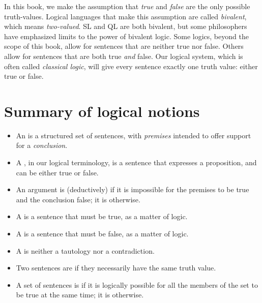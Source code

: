 In this book, we make the assumption that \emph{true} and \emph{false} are the only possible truth-values. Logical languages that make this assumption are called \emph{bivalent}, which means \emph{two-valued}. SL and QL are both bivalent, but some philosophers have emphasized limits to the power of bivalent logic. Some logics, beyond the scope of this book, allow for sentences that are neither true nor false. Others allow for sentences that are both true \emph{and} false. Our logical system, which is often called \emph{classical logic}, will give every sentence exactly one truth value: either true or false.


\section*{Summary of logical notions}
\begin{itemize}

\item An  is a structured set of sentences, with \emph{premises} intended to offer support for a \emph{conclusion}.

\item A , in our logical terminology, is a sentence that expresses a proposition, and can be either true or false.

\item An argument is (deductively)  if it is impossible for the premises to be true and the conclusion false; it is  otherwise.

\item A  is a sentence that must be true, as a matter of logic.

\item A  is a sentence that must be false, as a matter of logic.

\item A  is neither a tautology nor a contradiction.

\item Two sentences are  if they necessarily have the same truth value.

\item A set of sentences is  if it is logically possible for all the members of the set to be true at the same time; it is  otherwise.
\end{itemize}


